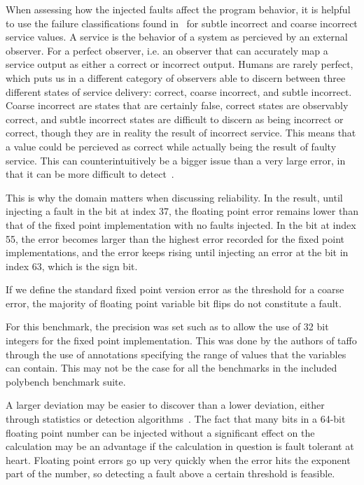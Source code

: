 When assessing how the injected faults affect the program behavior, it is helpful to use the failure classifications found in~\citet{failure_class_with_respect_to_detection} for subtle incorrect and coarse incorrect service values. A service is the behavior of a system as percieved by an external observer. For a perfect observer, i.e. an observer that can accurately map a service output as either a correct or incorrect output. Humans are rarely perfect, which puts us in a different category of observers able to discern between three different states of service delivery: correct, coarse incorrect, and subtle incorrect.  Coarse incorrect are states that are certainly false, correct states are observably correct, and subtle incorrect states are difficult to discern as being incorrect or correct, though they are in reality the result of incorrect service. This means that a value could be percieved as correct while actually being the result of faulty service. This can counterintuitively be a bigger issue than a very large error, in that it can be more difficult to detect~\citep{hodge2004survey}.

This is why the domain matters when discussing reliability. In the result, until injecting a fault in the bit at index 37, the floating point error remains lower than that of the fixed point implementation with no faults injected. In the bit at index 55, the error becomes larger than the highest error recorded for the fixed point implementations, and the error keeps rising until injecting an error at the bit in index 63, which is the sign bit.

If we define the standard fixed point version error as the threshold for a coarse error, the majority of floating point variable bit flips do not constitute a fault. 

For this benchmark, the precision was set such as to allow the use of 32 bit integers for the fixed point implementation. This was done by the authors of taffo through the use of annotations specifying the range of values that the variables can contain. This may not be the case for all the benchmarks in the included polybench benchmark suite.

A larger deviation may be easier to discover than a lower deviation, either through statistics or detection algorithms~\citep{hodge2004survey}. The fact that many bits in a 64-bit floating point number can be injected without a significant effect on the calculation may be an advantage if the calculation in question is fault tolerant at heart. Floating point errors go up very quickly when the error hits the exponent part of the number, so detecting a fault above a certain threshold is feasible.

